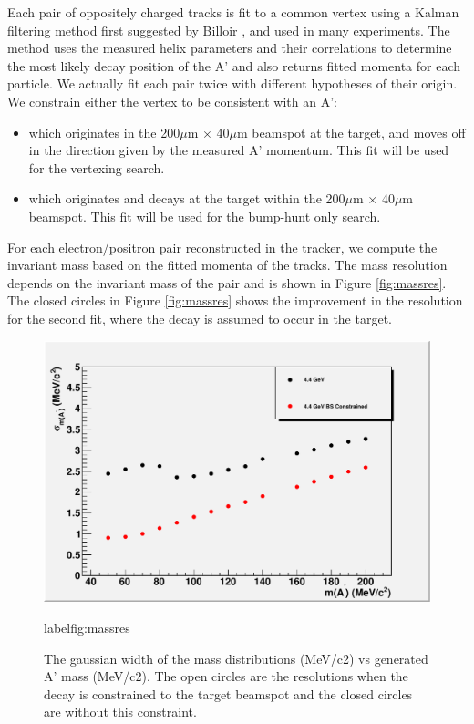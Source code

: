 Each pair of oppositely charged tracks is fit to a common vertex using a Kalman filtering 
method first suggested by Billoir \cite{bf}, \cite{bq} and used in many experiments.  The method 
uses the measured helix parameters and their correlations to determine the most likely 
decay position of the A' and also returns fitted momenta for each particle.  We actually 
fit each pair twice with different hypotheses of their origin.  We constrain either 
the vertex to be consistent with an A':

\begin{itemize}
\item which originates in the 200$\mu$m $\times$ 40$\mu$m beamspot at the target, and moves off 
in the direction given by the measured A' momentum.  This fit will be used for the vertexing search.  
\item which originates and decays at the target within the 200$\mu$m $\times$ 40$\mu$m beamspot.  
This fit will be used for the bump-hunt only search.  
\end{itemize}

For each electron/positron pair reconstructed in the tracker, we compute the invariant mass based 
on the fitted momenta of the tracks.  The mass resolution depends on the invariant mass of the pair 
and is shown in Figure \ref{fig:massres}.  The closed circles  in Figure \ref{fig:massres} shows the improvement 
in the resolution for the second fit, where the decay is assumed to occur in the target.  

\begin{figure}
\includegraphics[scale=0.8]{TrackingPerformance/massRes-4pt4.pdf}
\caption{The gaussian width of the mass distributions (MeV/c2) vs generated A' mass (MeV/c2). 
 The open circles are the resolutions when the decay is constrained to the target beamspot 
and the closed circles are without this constraint.    }
label{fig:massres}
\end{figure}



